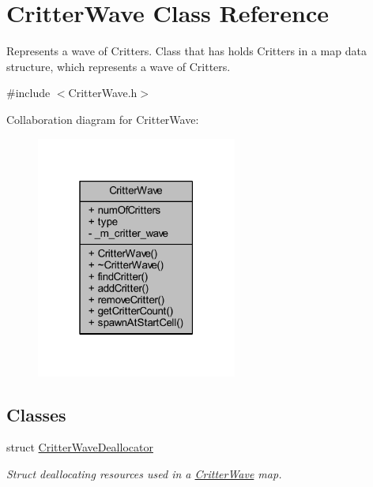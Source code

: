 \hypertarget{class_critter_wave}{\section{Critter\+Wave Class Reference}
\label{class_critter_wave}
}


Represents a wave of Critters. Class that has holds Critters in a map data structure, which represents a wave of Critters.  




{\ttfamily \#include $<$Critter\+Wave.\+h$>$}



Collaboration diagram for Critter\+Wave\+:
\nopagebreak
\begin{figure}[H]
\begin{center}
\leavevmode
\includegraphics[width=187pt]{class_critter_wave__coll__graph}
\end{center}
\end{figure}
\subsection*{Classes}
\begin{DoxyCompactItemize}
\item 
struct \hyperlink{struct_critter_wave_1_1_critter_wave_deallocator}{Critter\+Wave\+Deallocator}
\begin{DoxyCompactList}\small\item\em Struct deallocating resources used in a \hyperlink{class_critter_wave}{Critter\+Wave} map. \end{DoxyCompactList}\end{DoxyCompactItemize}
